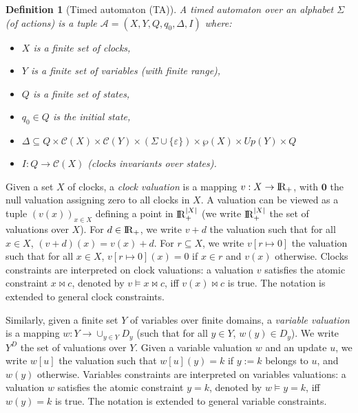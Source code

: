 \documentclass[a4paper,10pt]{article}
\newtheorem{definition}{Definition}
\def\A{\ensuremath{\mathcal{A}}}
\def\C{\ensuremath{\mathcal{C}}}
\def\bbbr{{\rm I\!R }}
\begin{document}
\begin{definition}[Timed automaton (TA)]
{\rm
A timed automaton over an alphabet $\Sigma$ (of actions) is a tuple $\A=(X,Y,Q,q_0,\Delta,I)$ where:
\begin{itemize}
\item $X$ is a finite set of clocks,
\item $Y$ is a finite set of variables (with finite range),
\item $Q$ is a finite set of states,
\item $q_0 \in Q$ is the initial state,
\item $\Delta \subseteq Q \times \C(X) \times \C(Y) \times (\Sigma
  \cup \{ \varepsilon \}) \times \wp(X) \times Up(Y) \times Q$
\item $I : Q \to \C(X)$ (clocks invariants over states).
\end{itemize}
}
\end{definition}

Given a set $X$ of clocks, a \emph{clock valuation} is a mapping $v : X \to
\bbbr_+$, with $\mathbf{0}$ the null valuation assigning zero to all
clocks in $X$. 
A valuation can be viewed as a tuple $(v(x))_{x \in X}$ defining a
point in $\bbbr_{+}^{|X|}$
(we write $\bbbr_{+}^{|X|}$ the set of valuations over $X$).
For $d \in \bbbr_+$, we write $v+d$ the valuation such
that for all $x \in X$, $(v+d)(x) = v(x) + d$. For $r \subseteq X$, we
write $v[r \mapsto 0]$ the valuation such
that for all $x \in X$, $v[r \mapsto 0](x) =0$ if $x \in r$ and $v(x)$
otherwise. Clocks constraints are interpreted on clock valuations: a
valuation $v$ satisfies the atomic constraint $x \bowtie c$, denoted by
$v \models x \bowtie c$, iff $v(x) \bowtie c$ is true. The notation is
extended to general clock constraints. 

Similarly,
given a finite set $Y$ of variables over finite domains,
a \emph{variable valuation} is a mapping $w : Y \to
\cup_{y \in Y} D_y$ (such that for all $y \in Y$, $w(y) \in D_y$).
We write $Y^D$ the set of valuations over $Y$.
Given a variable valuation $w$ and an update $u$, we write $w[u]$ the
valuation such that $w[u](y) = k$ if $y := k$ belongs to $u$, and
$w(y)$ otherwise.
Variables constraints are interpreted on variables valuations: a
valuation $w$ satisfies the atomic constraint $y=k$, denoted by
$w \models y=k$, iff $w(y) = k$ is true. The notation is
extended to general variable constraints. 
\end{document}
